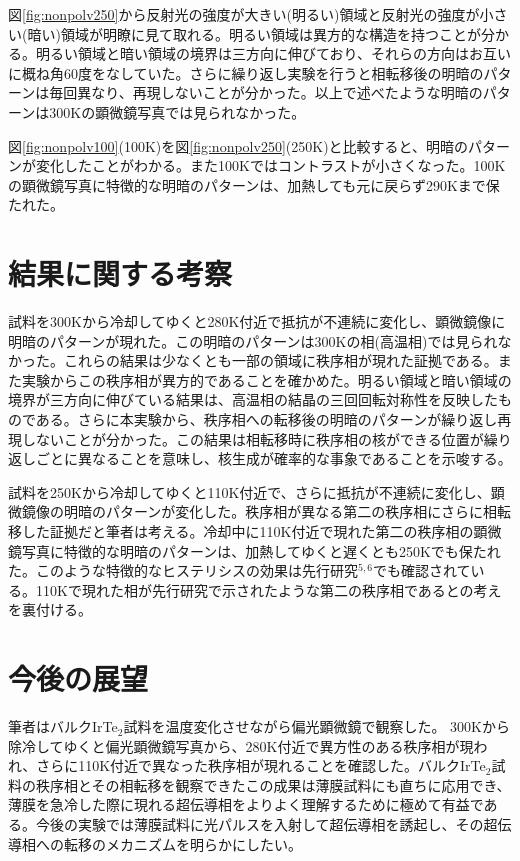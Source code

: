 \documentclass[11pt,a4paper]{jsarticle}
\begin{document}
図\ref{fig:nonpolv250}から反射光の強度が大きい(明るい)領域と反射光の強度が小さい(暗い)領域が明瞭に見て取れる。明るい領域は異方的な構造を持つことが分かる。明るい領域と暗い領域の境界は三方向に伸びており、それらの方向はお互いに概ね角60度をなしていた。さらに繰り返し実験を行うと相転移後の明暗のパターンは毎回異なり、再現しないことが分かった。以上で述べたような明暗のパターンは300Kの顕微鏡写真では見られなかった。

図\ref{fig:nonpolv100}(100K)を図\ref{fig:nonpolv250}(250K)と比較すると、明暗のパターンが変化したことがわかる。また100Kではコントラストが小さくなった。100Kの顕微鏡写真に特徴的な明暗のパターンは、加熱しても元に戻らず290Kまで保たれた。

\section{結果に関する考察}
試料を300Kから冷却してゆくと280K付近で抵抗が不連続に変化し、顕微鏡像に明暗のパターンが現れた。この明暗のパターンは300Kの相(高温相)では見られなかった。これらの結果は少なくとも一部の領域に秩序相が現れた証拠である。また実験からこの秩序相が異方的であることを確かめた。明るい領域と暗い領域の境界が三方向に伸びている結果は、高温相の結晶の三回回転対称性を反映したものである。さらに本実験から、秩序相への転移後の明暗のパターンが繰り返し再現しないことが分かった。この結果は相転移時に秩序相の核ができる位置が繰り返しごとに異なることを意味し、核生成が確率的な事象であることを示唆する。

試料を250Kから冷却してゆくと110K付近で、さらに抵抗が不連続に変化し、顕微鏡像の明暗のパターンが変化した。秩序相が異なる第二の秩序相にさらに相転移した証拠だと筆者は考える。冷却中に110K付近で現れた第二の秩序相の顕微鏡写真に特徴的な明暗のパターンは、加熱してゆくと遅くとも250Kでも保たれた。このような特徴的なヒステリシスの効果は先行研究$^{5,6}$でも確認されている。110Kで現れた相が先行研究で示されたような第二の秩序相であるとの考えを裏付ける。
 
 \section{今後の展望}
筆者はバルクIrTe$_2$試料を温度変化させながら偏光顕微鏡で観察した。
300Kから除冷してゆくと偏光顕微鏡写真から、280K付近で異方性のある秩序相が現われ、さらに110K付近で異なった秩序相が現れることを確認した。バルクIrTe$_2$試料の秩序相とその相転移を観察できたこの成果は薄膜試料にも直ちに応用でき、薄膜を急冷した際に現れる超伝導相をよりよく理解するために極めて有益である。今後の実験では薄膜試料に光パルスを入射して超伝導相を誘起し、その超伝導相への転移のメカニズムを明らかにしたい。
\end{document}
